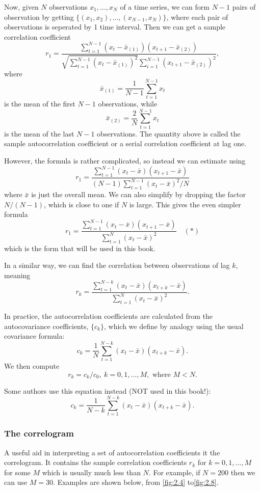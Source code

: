 Now, given $N$ observations $x_1, \dots, x_N$ of a time series, we can form $N - 1$ pairs of observation by getting $\{ (x_1, x_2), \dots, (x_{N-1}, x_N) \}$, where each pair of observations is seperated by 1 time interval. Then we can get a sample correlation coefficient 
\[ r_1 = \frac{
\sum_{t = 1}^{N - 1} (x_t - \bar{x}_{(1)}) (x_{t+1} - \bar{x}_{(2)})
}{\sqrt{\sum_{t = 1}^{N - 1} (x_t - \bar{x}_{(1)})^2} \sum_{i = 1}^{N - 1} (x_{t+1} - \bar{x}_{(2)})^2}, \]
where 
\[ \bar{x}_{(1)} = \frac{1}{N - 1}\sum_{t = 1}^{N - 1} x_t \]
is the mean of the first $N - 1$ observations, while 
\[ \bar{x}_{(2)} = \frac{2}{N}\sum_{t = 1}^{N - 1} x_t \]
is the mean of the last $N - 1$ observations. The quantity above is called the sample autocorrelation coefficient or a serial correlation coefficient at lag one.

However, the formula is rather complicated, so instead we can estimate using 
\[ r_1 = \frac{
\sum_{t = 1}^{N - 1} (x_t - \bar{x}) (x_{t+1} - \bar{x})
}{(N - 1)\sum_{t = 1}^{N - 1} (x_t - \bar{x})^2 / N} \]
where $\bar{x}$ is just the overall mean. We can also simplify by dropping the factor $N/(N-1)$, which is close to one if $N$ is large. This gives the even simpler formula 
\[ r_1 = \frac{
\sum_{t = 1}^{N - 1} (x_t - \bar{x}) (x_{t+1} - \bar{x})
}{\sum_{t = 1}^{N} (x_t - \bar{x})^2} \quad (*) \]
which is the form that will be used in this book.

In a similar way, we can find the correlation between observations of lag $k$, meaning 
\[ r_k = \frac{
\sum_{t = 1}^{N - k} (x_t - \bar{x}) (x_{t+k} - \bar{x})
}{\sum_{t = 1}^{N} (x_t - \bar{x})^2}. \]

In practice, the autocorrelation coefficients are calculated from the autocovariance coefficients, $\{ c_k \}$, which we define by analogy using the usual covariance formula:
\[ c_k = \frac{1}{N}\sum_{t = 1}^{N - k} (x_t - \bar{x})(x_{t+k} - \bar{x}). \]
We then compute 
\[ r_k = c_k / c_0, \ k = 0, 1, \dots, M, \text{ where } M < N. \]

Some authors use this equation instead (NOT used in this book!):
\[ c_k = \frac{1}{N - k}\sum_{t = 1}^{N - k} (x_t - \bar{x})(x_{t+k} - \bar{x}). \]


\subsubsection{The correlogram}
A useful aid in interpreting a set of autocorrelation coefficients it the correlogram. It contains the sample correlation coefficients $r_k$ for $k = 0, 1, \dots, M$ for some $M$ which is usually much less than $N$. For example, if $N = 200$ then we can use $M = 30$. Examples are shown below, from \cref{fig:2.4} to\cref{fig:2.8}.


